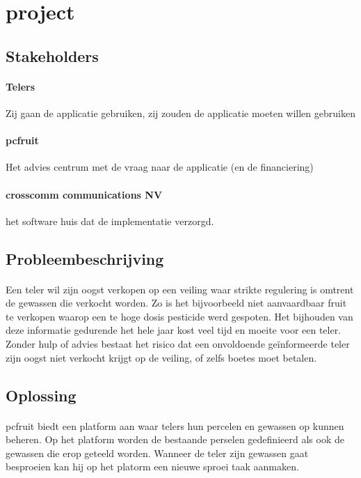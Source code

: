 \section {project}


\subsection {Stakeholders}

\paragraph {Telers} Zij gaan de applicatie gebruiken, zij zouden de applicatie moeten willen
gebruiken

\paragraph {pcfruit} Het advies centrum met de vraag naar de applicatie (en de financiering)

\paragraph {crosscomm communications NV} het software huis dat de implementatie verzorgd.


\subsection {Probleembeschrijving}

\paragraph {} Een teler wil zijn oogst verkopen op een veiling waar strikte regulering is
omtrent de gewassen die verkocht worden. Zo is het bijvoorbeeld niet aanvaardbaar fruit te
verkopen waarop een te hoge dosis pesticide werd gespoten. Het bijhouden van deze
informatie gedurende het hele jaar kost veel tijd en moeite voor een teler. Zonder hulp of
advies bestaat het risico dat een onvoldoende geïnformeerde teler zijn oogst niet verkocht
krijgt op de veiling, of zelfs boetes moet betalen.


\subsection {Oplossing}

\paragraph {} pcfruit biedt een platform aan waar telers hun percelen en gewassen op
kunnen beheren. Op het platform worden de bestaande perselen gedefinieerd als ook de
gewassen die erop geteeld worden. Wanneer de teler zijn gewassen gaat besproeien kan hij
op het platorm een nieuwe sproei taak aanmaken.


